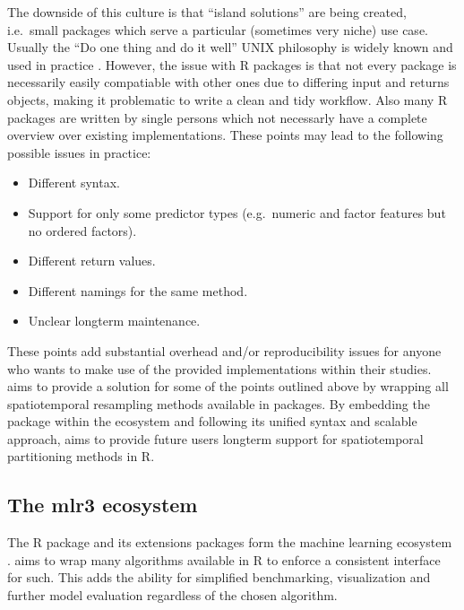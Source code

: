 \documentclass[
]{jss}
\providecommand{\tightlist}{%
  \setlength{\itemsep}{0pt}\setlength{\parskip}{0pt}}
\begin{document}
The downside of this culture is that ``island solutions'' are being
created, i.e.~small packages which serve a particular (sometimes very
niche) use case. Usually the ``Do one thing and do it well'' UNIX
philosophy is widely known and used in practice \citep{raymond2003art}.
However, the issue with R packages is that not every package is
necessarily easily compatiable with other ones due to differing input
and returns objects, making it problematic to write a clean and tidy
workflow. Also many R packages are written by single persons which not
necessarly have a complete overview over existing implementations. These
points may lead to the following possible issues in practice:

\begin{itemize}
\tightlist
\item
  Different syntax.
\item
  Support for only some predictor types (e.g.~numeric and factor
  features but no ordered factors).
\item
  Different return values.
\item
  Different namings for the same method.
\item
  Unclear longterm maintenance.
\end{itemize}

These points add substantial overhead and/or reproducibility issues for
anyone who wants to make use of the provided implementations within
their studies.  aims to provide a solution for
some of the points outlined above by wrapping all spatiotemporal
resampling methods available in  packages. By embedding the
package within the  ecosystem and following its unified syntax
and scalable approach,  aims to provide future
users longterm support for spatiotemporal partitioning methods in R.

\hypertarget{the-mlr3-ecosystem}{%
\subsection{The mlr3 ecosystem}\label{the-mlr3-ecosystem}}

The  R package and its extensions packages form the 
machine learning ecosystem \citep{mlr3}.  aims to wrap many
algorithms available in R to enforce a consistent interface for such.
This adds the ability for simplified benchmarking, visualization and
further model evaluation regardless of the chosen algorithm.
\end{document}
